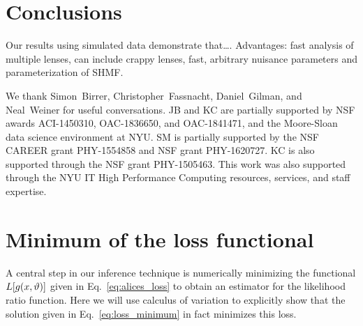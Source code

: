 \documentclass[twocolumn]{aastex62}
\begin{document}
\section{Conclusions}
\label{sec:conclusions}

Our results using simulated data demonstrate that\dots. Advantages: fast analysis of multiple lenses, can include crappy lenses, fast, arbitrary nuisance parameters and parameterization of SHMF. 

\acknowledgements

We thank Simon~Birrer, Christopher~Fassnacht, Daniel~Gilman, and Neal~Weiner for useful conversations. JB and KC are partially supported by NSF awards ACI-1450310, OAC-1836650, and OAC-1841471, and the Moore-Sloan data science environment at NYU. SM is partially supported by the NSF CAREER grant PHY-1554858 and NSF grant PHY-1620727. KC is also supported through the NSF grant PHY-1505463. This work was also supported through the NYU IT High Performance Computing resources, services, and staff expertise.



\appendix
\section{Minimum of the loss functional}
\label{app:variation}

A central step in our inference technique is numerically minimizing the functional $L[g(x, \vartheta)]$ given in Eq.~\eqref{eq:alices_loss} to obtain an estimator for the likelihood ratio function. Here we will use calculus of variation to explicitly show that the solution given in Eq.~\eqref{eq:loss_minimum} in fact minimizes this loss.
\end{document}
